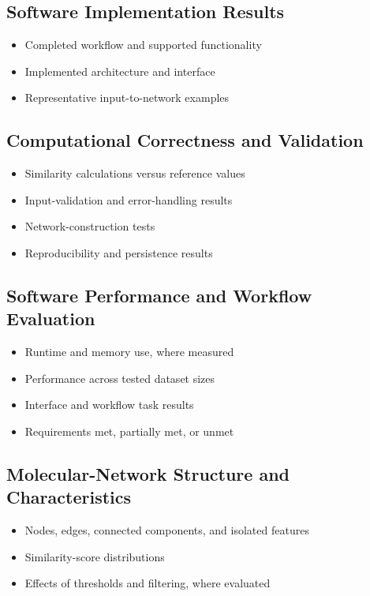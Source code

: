 \documentclass[11pt]{article}
\begin{document}
\begin{doublespace}
    \subsection{Software Implementation Results}
        \begin{itemize}
            \item Completed workflow and supported functionality
            \item Implemented architecture and interface
            \item Representative input-to-network examples
        \end{itemize}

    \subsection{Computational Correctness and Validation}
        \begin{itemize}
            \item Similarity calculations versus reference values
            \item Input-validation and error-handling results
            \item Network-construction tests
            \item Reproducibility and persistence results
        \end{itemize}

    \subsection{Software Performance and Workflow Evaluation}
        \begin{itemize}
            \item Runtime and memory use, where measured
            \item Performance across tested dataset sizes
            \item Interface and workflow task results
            \item Requirements met, partially met, or unmet
        \end{itemize}

    \subsection{Molecular-Network Structure and Characteristics}
        \begin{itemize}
            \item Nodes, edges, connected components, and isolated features
            \item Similarity-score distributions
            \item Effects of thresholds and filtering, where evaluated
        \end{itemize}


\end{doublespace}
\end{document}
